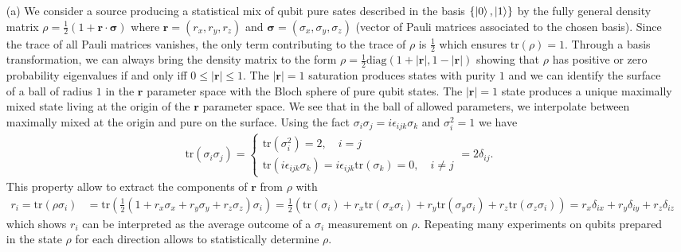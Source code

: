 \documentclass[10pt, a4paper]{article}
\begin{document}
{\begin{enumerate}
  \item[(a)] We consider a source producing a statistical mix of qubit pure sates described in the basis $\{\ket{0}, \ket{1}\}$ by the fully general density matrix $\rho = \frac{1}{2}(1 + \mathbf{r} \cdot \mathbf{\sigma})$ where $\mathbf{r} = (r_x, r_y, r_z)$ and $\mathbf{\sigma} = (\sigma_x, \sigma_y, \sigma_z)$ (vector of Pauli matrices associated to the chosen basis). Since the trace of all Pauli matrices vanishes, the only term contributing to the trace of $\rho$ is $\frac{1}{2}$ which ensures $\text{tr}(\rho) = 1$. Through a basis transformation, we can always bring the density matrix to the form $\rho = \frac{1}{2}\text{diag}(1+|\mathbf{r}|, 1-|\mathbf{r}|)$ showing that $\rho$ has positive or zero probability eigenvalues if and only iff $0 \leq |\mathbf{r}| \leq 1$. The $|\mathbf{r}| = 1$ saturation produces states with purity $1$ and we can identify the surface of a ball of radius $1$ in the $\mathbf{r}$ parameter space with the Bloch sphere of pure qubit states. The $|\mathbf{r}| = 1$ state produces a unique maximally mixed state living at the origin of the $\mathbf{r}$ parameter space. We see that in the ball of allowed parameters, we interpolate between maximally mixed at the origin and pure on the surface. Using the fact $\sigma_{i}\sigma_{j} = i \epsilon_{ijk} \sigma_k$ and $\sigma_{i}^2 = 1$ we have 
  \begin{align*}
    \text{tr}(\sigma_i \sigma_j) =
    \begin{cases}
      \text{tr}(\sigma_i^2) = 2, \quad i = j\\
      \text{tr}(i \epsilon_{ijk} \sigma_k) = i \epsilon_{ijk}\text{tr}(\sigma_k) = 0, \quad i \neq j
    \end{cases} 
    = 2 \delta_{ij}.
  \end{align*}
  This property allow to extract the components of $\mathbf{r}$ from $\rho$ with 
  \begin{align*}
    r_i = \text{tr}(\rho \sigma_i) &= \text{tr}\left(\frac{1}{2}(1 + r_x \sigma_x + r_y \sigma_y + r_z \sigma_z) \sigma_i\right) = \frac{1}{2}\left(\text{tr}\left(\sigma_i\right) +  r_x \text{tr}\left(\sigma_x \sigma_i\right) + r_y \text{tr}\left(\sigma_y \sigma_i\right) +  r_z \text{tr}\left(\sigma_z \sigma_i\right)\right) = r_x \delta_{ix} + r_y \delta_{iy} + r_z \delta_{iz}
  \end{align*}
  which shows $r_i$ can be interpreted as the average outcome of a $\sigma_i$ measurement on $\rho$. Repeating many experiments on qubits prepared in the state $\rho$ for each direction allows to statistically determine $\rho$. 

\end{enumerate}}
\end{document}

